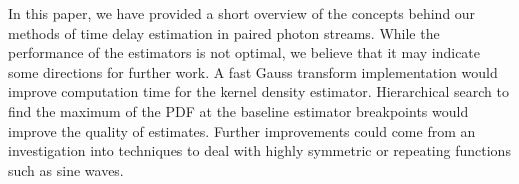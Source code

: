 \documentclass[a4paper,11pt]{article}
\begin{document}
  In this paper, we have provided a short overview of the concepts behind our
  methods of time delay estimation in paired photon streams. While the
  performance of the estimators is not optimal, we believe that it may indicate
  some directions for further work. A fast Gauss transform implementation would
  improve computation time for the kernel density estimator. Hierarchical search
  to find the maximum of the PDF at the baseline estimator breakpoints would
  improve the quality of estimates. Further improvements could come from an
  investigation into techniques to deal with highly symmetric or repeating
  functions such as sine waves.

\printbibliography
\end{document}
